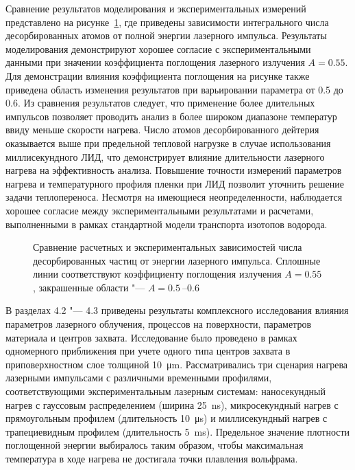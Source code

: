 Сравнение результатов моделирования и экспериментальных измерений представлено на рисунке~\cref{fig:LID_Comparison}, где приведены зависимости интегрального числа десорбированных атомов от полной энергии лазерного импульса. Результаты моделирования демонстрируют хорошее согласие с экспериментальными данными при значении коэффициента поглощения лазерного излучения \(A=\num{0.55}\). Для демонстрации влияния коэффициента поглощения на рисунке также приведена область изменения результатов при варьировании параметра от \num{0.5} до \num{0.6}. Из сравнения результатов следует, что применение более длительных импульсов позволяет проводить анализ в более широком диапазоне температур ввиду меньше скорости нагрева. Число атомов десорбированного дейтерия оказывается выше при предельной тепловой нагрузке в случае использования миллисекундного ЛИД, что демонстрирует влияние длительности лазерного нагрева на эффективность анализа. Повышение точности измерений параметров нагрева и температурного профиля пленки при ЛИД позволит уточнить решение задачи теплопереноса. Несмотря на имеющиеся неопределенности, наблюдается хорошее согласие между экспериментальными результатами и расчетами, выполненными в рамках стандартной модели транспорта изотопов водорода.

\begin{figure}[ht]
    \caption{Сравнение расчетных и экспериментальных зависимостей числа десорбированных частиц от энергии лазерного импульса. Сплошные линии соответствуют коэффициенту поглощения излучения \( A=\num{0.55} \), закрашенные области "--- \( A = \SIrange{0.5}{0.6}{} \)}\label{fig:LID_Comparison}
\end{figure}

В разделах 4.2 "--- 4.3 приведены результаты комплексного исследования влияния параметров лазерного облучения, процессов на поверхности, параметров материала и центров захвата. Исследование было проведено в рамках одномерного приближения при учете одного типа центров захвата в приповерхностном слое толщиной \SI{10}{\micro\meter}. Рассматривались три сценария нагрева лазерными импульсами с различными временными профилями, соответствующими экспериментальным лазерным системам: наносекундный нагрев с гауссовым распределением (ширина \SI{25}{\nano\second}), микросекундный нагрев с прямоугольным профилем (длительность \SI{10}{\micro\second}) и миллисекундный нагрев с трапециевидным профилем (длительность \SI{5}{\milli\second}). Предельное значение плотности поглощенной энергии выбиралось таким образом, чтобы максимальная температура в ходе нагрева не достигала точки плавления вольфрама.

